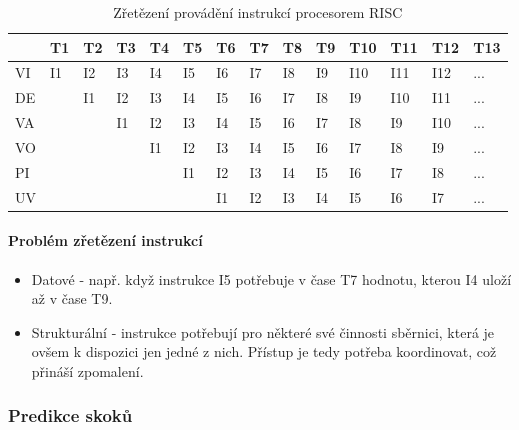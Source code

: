 \documentclass[10pt,a4paper]{article}
\begin{document}
\begin{table}[ht]
\centering
\begin{tabular}{l|lllllllllllll}
   & T1 & T2 & T3 & T4 & T5 & T6 & T7 & T8 & T9 & T10 & T11 & T12 & T13 \\ 
   \hline
VI & I1 & I2 & I3 & I4 & I5 & I6 & I7 & I8 & I9 & I10 & I11 & I12 & ... \\
DE &    & I1 & I2 & I3 & I4 & I5 & I6 & I7 & I8 & I9  & I10 & I11 & ... \\
VA &    &    & I1 & I2 & I3 & I4 & I5 & I6 & I7 & I8  & I9  & I10 & ... \\
VO &    &    &    & I1 & I2 & I3 & I4 & I5 & I6 & I7  & I8  & I9  & ... \\
PI &    &    &    &    & I1 & I2 & I3 & I4 & I5 & I6  & I7  & I8  & ... \\
UV &    &    &    &    &    & I1 & I2 & I3 & I4 & I5  & I6  & I7  & ...
\end{tabular}
\caption{Zřetězení provádění instrukcí procesorem RISC}
\label{tab:riscZretezeni}
\end{table}



\paragraph{Problém zřetězení instrukcí} 
\begin{itemize}
\item Datové - např. když instrukce I5 potřebuje v čase T7 hodnotu, kterou I4 uloží až v čase T9.
\item Strukturální - instrukce potřebují pro některé své činnosti sběrnici, která je ovšem k dispozici jen jedné z nich. Přístup je tedy potřeba koordinovat, což přináší zpomalení.
\end{itemize}
\subsubsection{Predikce skoků}
\end{document}
